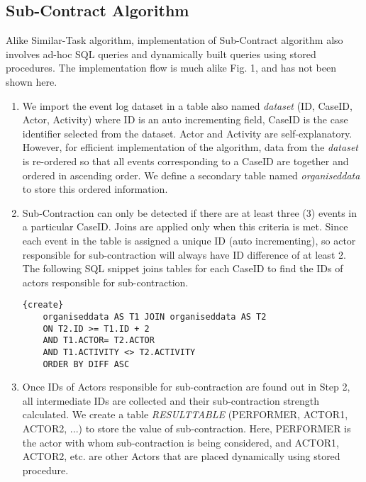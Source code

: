 \documentclass[11pt]{article}
\begin{document}
{\subsection{Sub-Contract Algorithm}
\par{Alike Similar-Task algorithm, implementation of Sub-Contract algorithm also involves ad-hoc SQL queries and dynamically built queries using stored procedures. The implementation flow is much alike Fig. 1, and has not been shown here.
\begin{enumerate}
\item We import the event log dataset in a table also named \textit{dataset} (ID, CaseID, Actor, Activity) where ID is an auto incrementing field, CaseID is the case identifier selected from the dataset. Actor and Activity are self-explanatory. However, for efficient implementation of the algorithm, data from the \textit{dataset} is re-ordered so that all events corresponding to a CaseID are together and ordered in ascending order. We define a secondary table named \textit{organiseddata} to store this ordered information.
\item Sub-Contraction can only be detected if there are at least three (3) events in a particular CaseID. Joins are applied only when this criteria is met. Since each event in the table is assigned a unique ID (auto incrementing), so actor responsible for sub-contraction will always have ID difference of at least 2. The following SQL snippet joins tables for each CaseID to find the IDs of actors responsible for sub-contraction.
\lstset{language=SQL} 
\begin{lstlisting}{create}
    organiseddata AS T1 JOIN organiseddata AS T2
    ON T2.ID >= T1.ID + 2
    AND T1.ACTOR= T2.ACTOR 
    AND T1.ACTIVITY <> T2.ACTIVITY
    ORDER BY DIFF ASC
\end{lstlisting}
\item Once IDs of Actors responsible for sub-contraction are found out in Step 2, all intermediate IDs are collected and their sub-contraction strength calculated. We create a table \textit{RESULTTABLE} (PERFORMER, ACTOR1, ACTOR2, ...) to store the value of sub-contraction. Here, PERFORMER is the actor with whom sub-contraction is being considered, and ACTOR1, ACTOR2, etc. are other Actors that are placed dynamically using stored procedure.

\end{enumerate}}}
\end{document}

